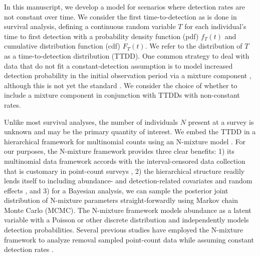 \documentclass[12pt]{article}
\begin{document}
In this manuscript, we develop a model for scenarios where detection rates are not constant over time. 
We consider the first time-to-detection as is done in survival analysis, defining a continuous random variable $T$ for each individual's time to first detection with a probability density function (pdf) $f_T(t)$ and cumulative distribution function (cdf) $F_T(t)$.  
We refer to the distribution of $T$ as a time-to-detection distribution (TTDD).  
One common strategy to deal with data that do not fit a constant-detection assumption is to model increased detection probability in the initial observation period via a mixture component \citep{Farnsworth2002, Farnsworth2005, EffordDawson2009, Etterson2009, Reidy2011}, although this is not yet the standard \citep{Solymos2013, Amundson2014, Reidy2016}. 
We consider the choice of whether to include a mixture component in conjunction with TTDDs with non-constant rates.

Unlike most survival analyses, the number of individuals $N$ present at a survey is unknown and may be the primary quantity of interest.  
We embed the TTDD in a hierarchical framework for multinomial counts using an N-mixture model \citep{Wyatt2002, Royle2004NMixture}.  
For our purposes, the N-mixture framework provides three clear benefits: 1) its multinomial data framework accords with the interval-censored data collection that is customary in point-count surveys \citep{Ralph1995}, 2) the hierarchical structure readily lends itself to including abundance- and detection-related covariates and random effects \citep{Dorazio2005, Etterson2009, Amundson2014}, and 3) for a Bayesian analysis, we can sample the posterior joint distribution of N-mixture parameters straight-forwardly using Markov chain Monte Carlo (MCMC).  
The N-mixture framework models abundance as a latent variable with a Poisson or other discrete distribution and independently models detection probabilities.  
Several previous studies have employed the N-mixture framework to analyze removal sampled point-count data while assuming constant detection rates \citep{Royle2004Generalized, Dorazio2005, Etterson2009, Solymos2013, Amundson2014, Reidy2016}.  



\end{document}
